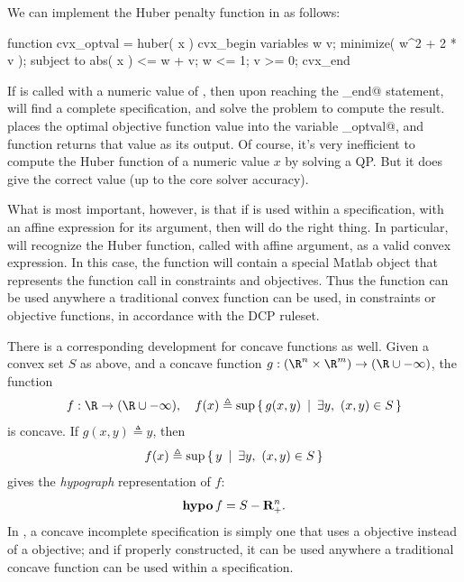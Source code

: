 \documentclass[12pt]{article}
\begin{document}
We can implement the Huber penalty function in \cvx as follows:
\begin{code}
	function cvx_optval = huber( x )
	cvx_begin
	    variables w v;
	    minimize( w^2 + 2 * v );
	    subject to
	        abs( x ) <= w + v;
	        w <= 1; v >= 0;
	cvx_end
\end{code}
If \verb@huber@ is called with a numeric value of \verb@x@, then
upon reaching the \verb@cvx_end@ statement, \cvx will find a complete
specification, and solve the problem to compute the result.
\cvx places the optimal objective function value
into the variable \verb@cvx_optval@, and
function returns that value as its output.
Of course, it's very inefficient to compute the Huber function of a 
numeric value $x$ by solving a QP.  But it does give the correct value
(up to the core solver accuracy).

What is most important, however, is that if \verb@huber@
is used within a \cvx specification, with an affine \cvx expression
for its argument, then \cvx will do the right thing.
In particular, \cvx will recognize the Huber function, called with 
affine argument, as a valid convex expression.
In this case, the function \verb@huber@ will contain a special Matlab 
object that represents the function call in constraints and objectives.
Thus the function \verb@huber@ can be used anywhere a traditional convex
function can be used, in constraints or objective functions,
in accordance with the DCP ruleset.

There is a corresponding development for concave functions as well.
Given a convex set
$S$ as above, and a concave function
$g:(\R^n\times\R^m)\rightarrow(\R\cup-\infty)$,
the function
\begin{equation}
	\label{eq:partial2}
	f:\R\rightarrow(\R\cup-\infty), \quad f(x) 
\triangleq \sup\Condset{g(x,y)}{\exists y,~(x,y)\in S }
\end{equation}
is concave.
If $g(x,y)\triangleq y$, then
\begin{equation}
	f(x) \triangleq \sup\left\{\,y\,~|~\,\exists y,~(x,y)\in S\,\right\}
\end{equation}
gives the \emph{hypograph} representation of $f$:
\[
\operatorname{\textbf{hypo}} f = S - \mathbf{R}_+^n.
\]
In \cvx, a concave incomplete specification is simply one that
uses a \verb@maximize@ objective instead of a \verb@minimize@ objective;
and if properly constructed, it can be used anywhere a traditional
concave function can be used within a \cvx specification. 
\end{document}
